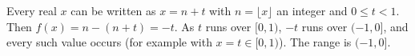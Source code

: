 Every real $x$ can be written as $x=n+t$ with $n=\lfloor x\rfloor$ an integer and $0\le t<1$. Then $f(x)=n-(n+t)=-t$. As $t$ runs over $[0,1)$, $-t$ runs over $(-1,0]$, and every such value occurs (for example with $x=t\in[0,1)$). The range is $\boxed{(-1,0]}$.

